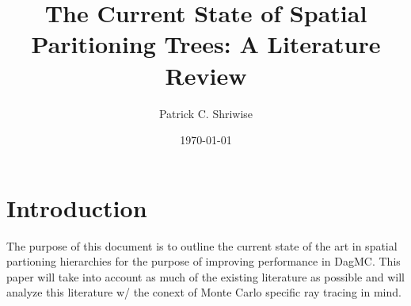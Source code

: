 \documentclass{article}
\title{The Current State of Spatial Paritioning Trees: A Literature Review}
\author{Patrick C. Shriwise}
\date{\today}
\begin{document}
\maketitle


\section{Introduction}

The purpose of this document is to outline the current state of the art in spatial partioning hierarchies for the purpose of improving performance in DagMC. This paper will take into account as much of the existing literature as possible and will analyze this literature w/ the conext of Monte Carlo specific ray tracing in mind. 
\end{document}
